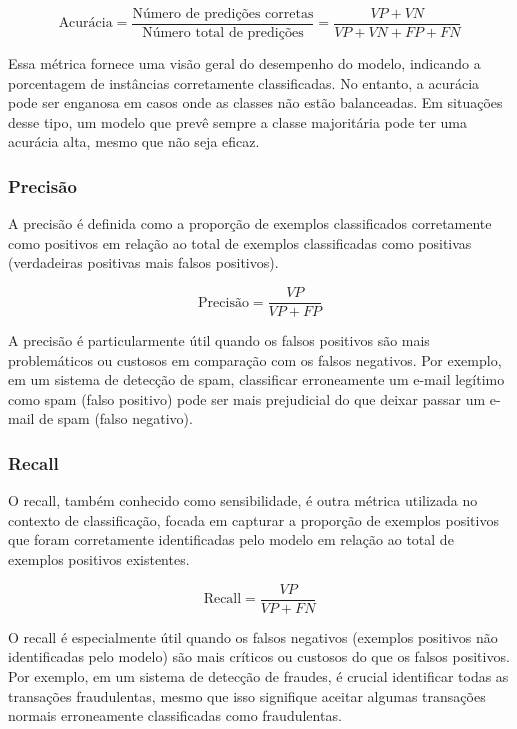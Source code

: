 \begin{equation}
  \text{Acurácia} = \frac{\text{Número de predições corretas}}{\text{Número total de predições}} = \frac{VP+VN}{VP+VN+FP+FN}
\end{equation}

Essa métrica fornece uma visão geral do desempenho do modelo, indicando a porcentagem de instâncias corretamente classificadas.
No entanto, a acurácia pode ser enganosa em casos onde as classes não estão balanceadas. 
Em situações desse tipo, um modelo que prevê sempre a classe majoritária pode ter uma acurácia alta, mesmo que não seja eficaz.

\subsubsection{Precisão}

A precisão é definida como a proporção de exemplos classificados corretamente como positivos em 
relação ao total de exemplos classificadas como positivas (verdadeiras positivas mais falsos positivos).

\begin{equation}
  \text{Precisão} = \frac{VP}{VP + FP}
\end{equation}

A precisão é particularmente útil quando os falsos positivos são mais problemáticos ou custosos
em comparação com os falsos negativos. Por exemplo, em um sistema de detecção de spam, classificar 
erroneamente um e-mail legítimo como spam (falso positivo) pode ser mais prejudicial do que deixar
passar um e-mail de spam (falso negativo).

\subsubsection{Recall}

O recall, também conhecido como sensibilidade, é outra métrica utilizada no contexto de classificação, 
focada em capturar a proporção de exemplos positivos que foram corretamente identificadas pelo modelo
em relação ao total de exemplos positivos existentes.

\begin{equation}
  \text{Recall} = \frac{VP}{VP + FN}
\end{equation}

O recall é especialmente útil quando os falsos negativos (exemplos positivos não identificadas pelo modelo) 
são mais críticos ou custosos do que os falsos positivos. Por exemplo, em um sistema de detecção de fraudes,
é crucial identificar todas as transações fraudulentas, mesmo que isso signifique aceitar algumas transações 
normais erroneamente classificadas como fraudulentas.


